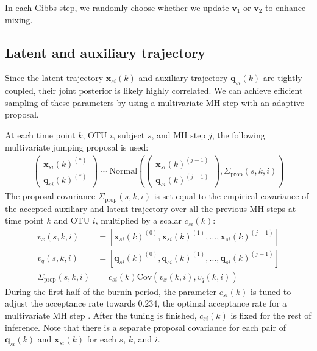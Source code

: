 \documentclass{article}
\newcommand{\Normaldist}{\text{Normal}}
\newcommand{\x}[2]{\mathbf{x}_{#2}(#1)}
\newcommand{\q}[2]{\mathbf{q}_{#2}(#1)}
\renewcommand{\v}[1]{\mathbf{v}_{#1}}
\begin{document}
In each Gibbs step, we randomly choose whether we update $\v{1}$ or $\v{2}$ to enhance mixing.

\subsection{Latent and auxiliary trajectory}
\label{subsection:learn_latent_and_aux}
Since the latent trajectory $\x{k}{si}$ and auxiliary trajectory $\q{k}{si}$ are tightly coupled, their joint posterior is likely highly correlated. We can achieve efficient sampling of these parameters by using a multivariate MH step with an adaptive proposal.

At each time point $k$, OTU $i$, subject $s$, and MH step $j$, the following multivariate jumping proposal is used:
\begin{align}
	\left(
	\begin{array}{ccc}
		\x{k}{si}^{(*)} \\
		\q{k}{si}^{(*)}
	\end{array} \right)
	\sim \Normaldist \left(
		\left(
		\begin{array}{ccc}
			\x{k}{si}^{(j-1)} \\
			\q{k}{si}^{(j-1)}
		\end{array} \right), \Sigma_{\text{prop}}(s,k,i)
	\right)
\end{align}
The proposal covariance $\Sigma_{\text{prop}}(s,k,i)$ is set equal to the empirical covariance of the accepted auxiliary and latent trajectory over all the previous MH steps at time point $k$ and OTU $i$, multiplied by a scalar $c_{si}(k)$:
\begin{align}
	v_x (s,k,i) & = [\x{k}{si}^{(0)}, \x{k}{si}^{(1)}, ..., \x{k}{si}^{(j-1)}] \\
	v_q (s,k,i) & = [\q{k}{si}^{(0)}, \q{k}{si}^{(1)}, ..., \q{k}{si}^{(j-1)}] \\
	\Sigma_{\text{prop}}(s,k,i) & = c_{si}(k) \text{Cov}(v_x (k,i), v_q (k,i))
\end{align}
During the first half of the burnin period, the parameter $c_{si}(k)$ is tuned to adjust the acceptance rate towards $0.234$, the optimal acceptance rate for a multivariate MH step \cite{cite:BDA}. After the tuning is finished, $c_{si}(k)$ is fixed for the rest of inference. Note that there is a separate proposal covariance for each pair of $\q{k}{si}$ and $\x{k}{si}$ for each $s$, $k$, and $i$.
\end{document}
